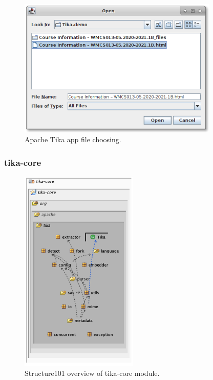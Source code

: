 \documentclass{article}
\begin{document}
\begin{figure}
    \centering
    \includegraphics[width=0.85\textwidth]{report/images/tika_app/filechooser.png}
    \caption{Apache Tika app file choosing.}
    \label{fig:tika_app/filechooser}
\end{figure}

\subsubsection{tika-core}
\begin{figure}
    \centering
    \includegraphics[width=0.5\textwidth]{report/images/tika_core/s101}
    \caption{Structure101 overview of tika-core module.}
    \label{fig:tika_core/s101}
\end{figure}
\end{document}
